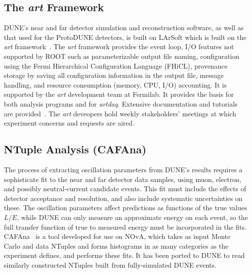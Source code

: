 \subsection{The {\it art} Framework}

DUNE's near and far detector simulation and reconstruction software, as well as that used for the ProtoDUNE
detectors, is built on LArSoft which is built on the {\it art} framework~\cite{Green:2012gv}.  The {\it art} framework
provides the event loop, I/O features not supported by ROOT such as parameterizable output file naming, configuration
using the Fermi Hierarchical Configuration Language (FHiCL), provenance storage by saving all configuration
information in the output file, message handling, and resource consumption (memory, CPU, I/O) accounting.  It
is supported by the {\it art} development team at Fermilab.  It provides the basis for both analysis programs
and for {\it artdaq}.  Extensive documentation and tutorials are provided~\cite{ref:artdoc}\cite{ref:arttutorial}.
The {\it art} deveopers hold weekly stakeholders' meetings at which experiment concerns and requests are aired.

\subsection{NTuple Analysis (CAFAna)}

The process of extracting oscillation parameters from DUNE's results requires a sophisticate fit to the near
and far detector data samples, using muon, electron, and possibly neutral-current candidate events.  This fit
must include the effects of detector acceptance and resolution, and also include systematic uncertainties on these.
The oscillation parameters affect predictions as functions of the true values $L/E$, while DUNE can only
measure an approximate energy on each event, so the full transfer function of true to measured energy must be
incorporated in the fits.  CAFAna~\cite{ref:cafanaredmine,Adamson:2017qqn} 
is a tool developed for use on NOvA, which takes as input
Monte Carlo and data NTuples and forms histograms in as many categories as the experiment defines, and performs
these fits.  It has been ported to DUNE to read similarly constructed NTuples built from fully-simulated
DUNE events.

